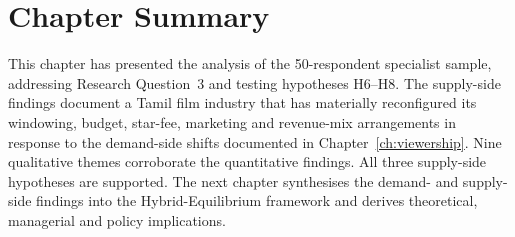 \section{Chapter Summary}
\label{sec:reconfig_summary}

This chapter has presented the analysis of the 50-respondent
specialist sample, addressing Research Question~3 and testing
hypotheses H6--H8.  The supply-side findings document a Tamil film
industry that has materially reconfigured its windowing, budget,
star-fee, marketing and revenue-mix arrangements in response to the
demand-side shifts documented in Chapter~\ref{ch:viewership}.  Nine
qualitative themes corroborate the quantitative findings.  All
three supply-side hypotheses are supported.  The next chapter
synthesises the demand- and supply-side findings into the Hybrid-Equilibrium
framework and derives theoretical, managerial and policy implications.
